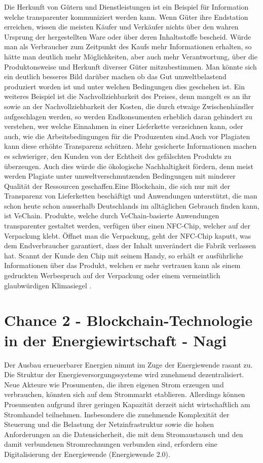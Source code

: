 Die Herkunft von Gütern und Dienstleistungen ist ein Beispiel für Information welche transparenter kommuniziert werden kann. Wenn Güter ihre Endstation erreichen, wissen die meisten Käufer und Verkäufer nichts über den wahren Ursprung der hergestellten Ware oder über deren Inhaltsstoffe bescheid. Würde man als Verbraucher zum Zeitpunkt des Kaufs mehr Informationen erhalten, so hätte man deutlich mehr Möglichkeiten, aber auch mehr Verantwortung, über die Produktonsweise und Herkunft diverser Güter mitzubestimmen. Man könnte sich ein deutlich besseres Bild darüber machen ob das Gut umweltbelastend produziert worden ist und unter welchen Bedingungen dies geschehen ist. \newline Ein weiteres Beispiel ist die Nachvollziehbarkeit des Preises, denn mangelt es an ihr sowie an der Nachvollziehbarkeit der Kosten, die durch etwaige Zwischenhändler aufgeschlagen werden, so werden Endkonsumenten erheblich daran gehindert zu verstehen, wer welche Einnahmen in einer Lieferkette verzeichnen kann, oder auch, wie die Arbeitsbedingungen für die Produzenten sind\cite{lieferkette}.\newline Auch vor Plagiaten kann diese erhöhte Transparenz schützen. Mehr gesicherte Informationen machen es schwieriger, den Kunden von der Echtheit des gefälschten Produkts zu überzeugen. Auch dies würde die ökologische Nachhaltigkeit fördern, denn meist werden Plagiate unter umweltverschmutzenden Bedingungen mit minderer Qualität der Ressourcen geschaffen.\newline Eine Blockchain, die sich nur mit der Transparenz von Lieferketten beschäftigt und Anwendungen unterstützt, die man schon heute schon ausserhalb Deutschlands im alltäglichen Gebrauch finden kann, ist VeChain. Produkte, welche durch VeChain-basierte Anwendungen transparenter gestaltet werden, verfügen über einen NFC-Chip, welcher auf der Verpackung klebt. Öffnet man die Verpackung, geht der NFC-Chip kaputt, was dem Endverbraucher garantiert, dass der Inhalt unverändert die Fabrik verlassen hat. Scannt der Kunde den Chip mit seinem Handy, so erhält er ausführliche Informationen über das Produkt, welchen er mehr vertrauen kann als einem gedruckten Werbespruch auf der Verpackung oder einem vermeintlich glaubwürdigen Klimasiegel \cite{vechain}\cite{veDoc}.
\section{Chance 2 - Blockchain-Technologie in der Energiewirtschaft - Nagi}
Der Ausbau erneuerbarer Energien nimmt im Zuge der Energiewende rasant zu. Die Struktur der Energieversorgungssysteme wird zunehmend dezentralisiert. Neue Akteure wie Prosumenten, die ihren eigenen Strom erzeugen und verbrauchen, könnten sich auf dem Strommarkt etablieren. Allerdings können Prosumenten aufgrund ihrer geringen Kapazität derzeit nicht wirtschaftlich am Stromhandel teilnehmen. Insbesondere die zunehmende Komplexität der Steuerung und die Belastung der Netzinfrastruktur sowie die hohen Anforderungen an die Datensicherheit, die mit dem Stromaustausch und den damit verbundenen Stromrechnungen verbunden sind, erfordern eine Digitalisierung der Energiewende (Energiewende 2.0).
\newline

